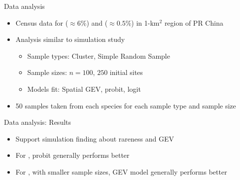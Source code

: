 \documentclass{beamer}
\begin{document}
\begin{frame}{Data analysis}
	\begin{itemize}\setlength{\itemsep}{1em}
		\item Census data for \tamarix{} ($\approx 6\%$) and \hedysarum{} ($\approx 0.5\%$) in 1-km$^2$ region of PR China
		\item Analysis similar to simulation study 
		\begin{itemize} \setlength{\itemsep}{0.5em}
			\item Sample types: Cluster, Simple Random Sample
			\item Sample sizes: $n = 100$, $250$ initial sites
			\item Models fit: Spatial GEV, probit, logit
		\end{itemize}
		\item 50 samples taken from each species for each sample type and sample size
	\end{itemize}
\end{frame}

\begin{frame}{Data analysis: Results}
	\begin{itemize} \setlength{\itemsep}{1em}
		\item Support simulation finding about rareness and GEV
		\item For \hedysarum{}, probit generally performs better
		\item For \tamarix{}, with smaller sample sizes, GEV model generally performs better
	\end{itemize}
\end{frame}
\end{document}
